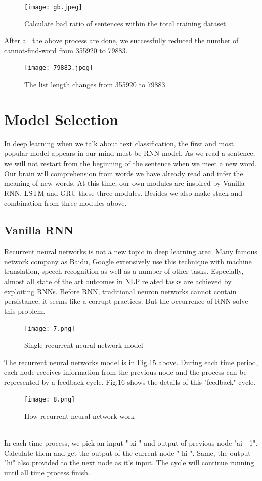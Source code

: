 \documentclass{article}
\begin{document}
\begin{figure}[H] %
	\centering
	\texttt{[image: gb.jpeg]}
	\caption{Calculate bad ratio of sentences within the total training dataset}
\end{figure}
\noindent After all the above process are done, we successfully reduced the number of cannot-find-word from 355920 to 79883.\\
\begin{figure}[H] %
	\centering
	\texttt{[image: 79883.jpeg]}
	\caption{The list length changes from 355920 to 79883}
\end{figure}





\section{ Model Selection}
\noindent In deep learning when we talk about text classification,
the first and most popular model appears in our mind must be RNN model. As we read a sentence, we will not restart from the beginning of the sentence when we meet a new word. Our brain will comprehension from words we have already read and infer the meaning of new words. At this time, our own modules are inspired by Vanilla RNN, LSTM and GRU these three modules. Besides we also make stack and combination from three modules above.
\subsection{Vanilla RNN}
\noindent Recurrent neural networks is not a new topic in deep learning area. Many famous network company as Baidu, Google extensively use this technique with machine translation, speech recognition as well as a number of other tasks. Especially, almost all state of the art outcomes in NLP related tasks are achieved by exploiting RNNs. Before RNN, traditional neuron networks cannot contain persistance, it seems like a corrupt practices. But the occurrence of RNN solve this problem.
\begin{figure}[H]
	\centering
	\texttt{[image: 7.png]}
	\caption{Single recurrent neural network model}
\end{figure}
\noindent The recurrent neural networks model is in Fig.15 above. During each time period, each node receives information from the previous node and the process can be represented by a feedback cycle. Fig.16 shows the details of this "feedback" cycle.
\begin{figure}[h]
	\centering
	\texttt{[image: 8.png]}
	\caption{How recurrent neural network work}
\end{figure}\\
\noindent In each time process, we pick an input " xi " and output of previous node "ai - 1". Calculate them and get the output of the current node " hi ". Same, the output "hi" also provided to the next node as it's input. The cycle will continue running until all time process finish.\\
\end{document}
